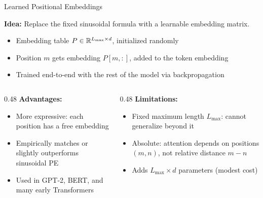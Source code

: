 \begin{frame}{Learned Positional Embeddings}

  \textbf{Idea:} Replace the fixed sinusoidal formula with a learnable embedding matrix.

  \vspace{0.5em}
  \begin{itemize}
    \item Embedding table $P \in \mathbb{R}^{L_{\max} \times d}$, initialized randomly
    \item Position $m$ gets embedding $P[m, :]$, added to the token embedding
    \item Trained end-to-end with the rest of the model via backpropagation
  \end{itemize}

  \vspace{0.5em}
  \begin{columns}[T]
    \begin{column}{0.48\textwidth}
      \textbf{Advantages:}
      \begin{itemize}
        \item More expressive: each position has a free embedding
        \item Empirically matches or slightly outperforms sinusoidal PE
        \item Used in GPT-2, BERT, and many early Transformers
      \end{itemize}
    \end{column}
    \begin{column}{0.48\textwidth}
      \textbf{Limitations:}
      \begin{itemize}
        \item Fixed maximum length $L_{\max}$: cannot generalize beyond it
        \item Absolute: attention depends on positions $(m, n)$, not relative distance $m - n$
        \item Adds $L_{\max} \times d$ parameters (modest cost)
      \end{itemize}
    \end{column}
  \end{columns}

\end{frame}


